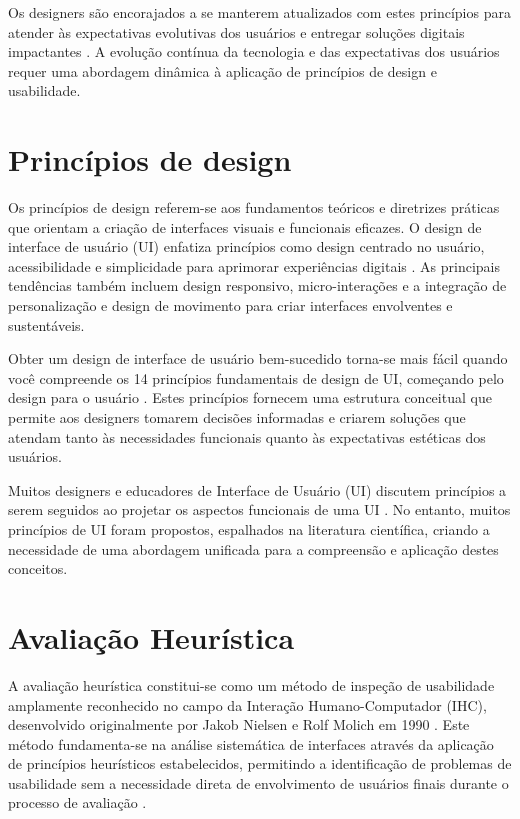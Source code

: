 Os designers são encorajados a se manterem atualizados com estes princípios para atender às expectativas evolutivas dos usuários e entregar soluções digitais impactantes \cite{medium_ui_principles_2025}. A evolução contínua da tecnologia e das expectativas dos usuários requer uma abordagem dinâmica à aplicação de princípios de design e usabilidade.

\section{Princípios de design}

Os princípios de design referem-se aos fundamentos teóricos e diretrizes práticas que orientam a criação de interfaces visuais e funcionais eficazes. O design de interface de usuário (UI) enfatiza princípios como design centrado no usuário, acessibilidade e simplicidade para aprimorar experiências digitais \cite{slideshare_ui_principles_2024}. As principais tendências também incluem design responsivo, micro-interações e a integração de personalização e design de movimento para criar interfaces envolventes e sustentáveis.

Obter um design de interface de usuário bem-sucedido torna-se mais fácil quando você compreende os 14 princípios fundamentais de design de UI, começando pelo design para o usuário \cite{uxpin_ui_principles}. Estes princípios fornecem uma estrutura conceitual que permite aos designers tomarem decisões informadas e criarem soluções que atendam tanto às necessidades funcionais quanto às expectativas estéticas dos usuários.

Muitos designers e educadores de Interface de Usuário (UI) discutem princípios a serem seguidos ao projetar os aspectos funcionais de uma UI \cite{tandfonline_ui_principles}. No entanto, muitos princípios de UI foram propostos, espalhados na literatura científica, criando a necessidade de uma abordagem unificada para a compreensão e aplicação destes conceitos.

\section{Avaliação Heurística}
A avaliação heurística constitui-se como um método de inspeção de usabilidade amplamente reconhecido no campo da Interação Humano-Computador (IHC), desenvolvido originalmente por Jakob Nielsen e Rolf Molich em 1990 \cite{nielsen1990heuristic}. Este método fundamenta-se na análise sistemática de interfaces através da aplicação de princípios heurísticos estabelecidos, permitindo a identificação de problemas de usabilidade sem a necessidade direta de envolvimento de usuários finais durante o processo de avaliação \cite{nielsen1994usability}.

